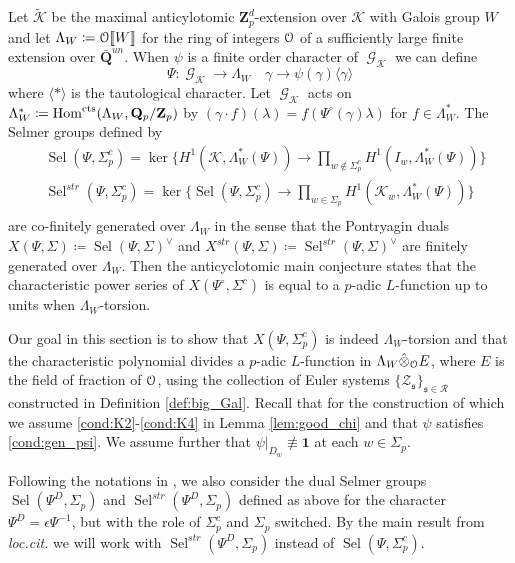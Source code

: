 \documentclass[leqno]{amsart}
\theoremstyle{definition}
\theoremstyle{remark}
\newcommand{\id}{\mathbf{1}}
\newcommand{\eo}{\EuScript{O}}
\newcommand{\Q}{{\mathbf{Q}}}
\newcommand{\Z}{{\mathbf{Z}}}
\newcommand{\Qp}{\mathbf{Q}_p}
\newcommand{\Zp}{\mathbf{Z}_p}
\DeclareMathOperator{\Hom}{Hom}
\DeclareMathOperator{\Gal}{\mathcal{G}}
\newcommand{\cts}{\textnormal{cts}}
\newcommand{\fs}{\mathfrak{s}}
\newcommand{\K}{{\mathcal{K}}} %
\DeclareMathOperator{\Sel}{Sel}
\begin{document}
Let $\tilde{\K}$ be the maximal anticylotomic $\Z_p^d$-extension
over $\K$ with Galois group $W$ 
and let $\Lambda_W\coloneqq\eo\llbracket W\rrbracket$
for the ring of integers $\eo$ of a sufficiently large
finite extension over $\bar{\Q}^{un}$.
When $\psi$ is a finite order character of $\Gal_\K$ we can define
\[
\Psi\colon \Gal_\K\to \Lambda_W\quad \gamma\to \psi(\gamma)
\langle \gamma\rangle
\]
where $\langle*\rangle$ is the tautological character.
Let $\Gal_\K$ acts on $\Lambda_W^*\coloneqq
\Hom^{\cts}(\Lambda_W,\Qp/\Zp)$ by
$(\gamma\cdot f)(\lambda)=f(\Psi^\circ(\gamma)\lambda)$
for $f\in \Lambda_W^*$.
The Selmer groups defined by
\begin{equation}\label{def:Selmers}
\begin{aligned}
    &\Sel(\Psi,\Sigma_p^c)=
    \ker\big\{
    H^1(\K,\Lambda_W^*(\Psi))\to 
    \prod_{w\notin \Sigma_p^c}
    H^1(I_w,\Lambda_W^*(\Psi))
    \big\}\\
    &\Sel^{str}(\Psi,\Sigma_p^c)=
    \ker\big\{
    \Sel(\Psi,\Sigma_p^c)\to
    \prod_{w\in \Sigma_p}
    H^1(\K_w,\Lambda_W^*(\Psi))
    \big\}\\
\end{aligned}
\end{equation}
are co-finitely generated over $\Lambda_W$
in the sense that the Pontryagin duals 
$X(\Psi,\Sigma)\coloneqq  \Sel(\Psi,\Sigma)^\vee$ and
$X^{str}(\Psi,\Sigma)\coloneqq  \Sel^{str}(\Psi,\Sigma)^\vee$ 
are finitely generated over $\Lambda_W$.
Then the anticyclotomic main conjecture
states that the characteristic power series
of $X(\Psi^\circ,\Sigma^c)$ 
is equal to a $p$-adic $L$-function up to units
when $\Lambda_W$-torsion.

Our goal in this section is to show that 
$X(\Psi,\Sigma_p^c)$ is indeed $\Lambda_W$-torsion
and that the characteristic polynomial divides
a $p$-adic $L$-function in 
$\Lambda_W\hat{\otimes}_\eo E$,
where $E$ is the field of fraction of $\eo$,
using the collection of Euler systems 
$\{\mathcal{Z}_\fs\}_{\fs\in\mathcal{R}}$
constructed in Definition \ref{def:big_Gal}.
Recall that for the construction of which 
we assume  \ref{cond:K2}-\ref{cond:K4}
in Lemma \ref{lem:good_chi}
and that $\psi$ satisfies \eqref{cond:gen_psi}.
We assume further that 
$\psi\vert_{D_w}\not\equiv \id$
at each $w\in \Sigma_p$.


Following the notations in \cite{Hsieh2010},
we also consider the dual Selmer groups 
$\Sel(\Psi^D,\Sigma_p)$ and
$\Sel^{str}(\Psi^D,\Sigma_p)$ defined as above
for the character $\Psi^D=\epsilon\Psi^{-1}$,
but with the role of $\Sigma_p^c$ and $\Sigma_p$ switched.
By the main result from \textit{loc.cit.}
we will work with $\Sel^{str}(\Psi^D,\Sigma_p)$
instead of $\Sel(\Psi,\Sigma_p^c)$.
\end{document}
